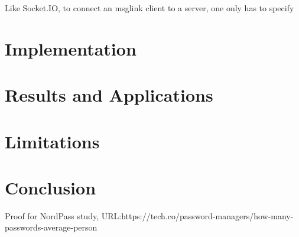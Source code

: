 \documentclass[conference]{IEEEtran}
\begin{document}
Like Socket.IO, to connect an msglink client to a server, one only has to specify 

\section{Implementation}

\section{Results and Applications}

\section{Limitations}

\section{Conclusion}




\listoffigures

\begin{thebibliography}{00}

     Proof for NordPass study, URL:https://tech.co/password-managers/how-many-passwords-average-person

\end{thebibliography}
\end{document}
